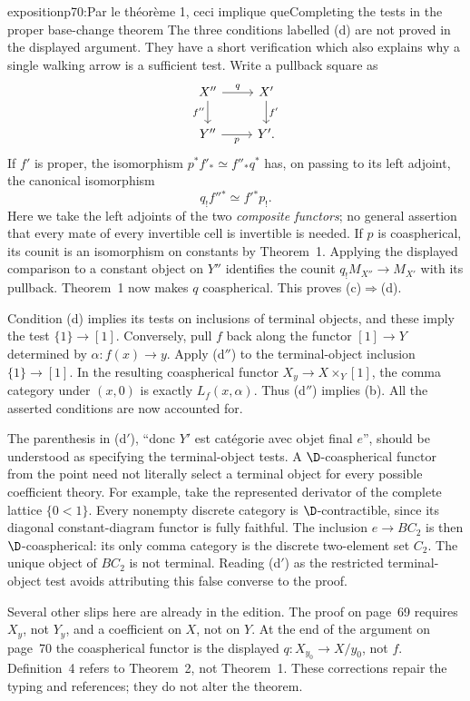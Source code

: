 \begin{dcomment}{exposition}{p70:Par le théorème 1, ceci implique que}{Completing the tests in the proper base-change theorem}
The three conditions labelled (d) are not proved in the displayed argument. They have a short verification which also explains why a single walking arrow is a sufficient test. Write a pullback square as
\[
\begin{tikzcd}
 X''\arrow[r,"q"]\arrow[d,"f''"']&X'\arrow[d,"f'"]\\
 Y''\arrow[r,"p"']&Y'.
\end{tikzcd}
\]
If $f'$ is proper, the isomorphism $p^*f'_*\simeq f''_*q^*$ has, on passing to its left adjoint, the canonical isomorphism
\[
 q_!f''{}^*\simeq f'{}^*p_!.
\]
Here we take the left adjoints of the two \emph{composite functors}; no general assertion that every mate of every invertible cell is invertible is needed. If $p$ is coaspherical, its counit is an isomorphism on constants by Theorem~1. Applying the displayed comparison to a constant object on $Y''$ identifies the counit $q_!M_{X''}\to M_{X'}$ with its pullback. Theorem~1 now makes $q$ coaspherical. This proves (c)$\Rightarrow$(d).

Condition (d) implies its tests on inclusions of terminal objects, and these imply the test $\{1\}\to[1]$. Conversely, pull $f$ back along the functor $[1]\to Y$ determined by $\alpha:f(x)\to y$. Apply (d$''$) to the terminal-object inclusion $\{1\}\to[1]$. In the resulting coaspherical functor $X_y\to X\times_Y[1]$, the comma category under $(x,0)$ is exactly $L_f(x,\alpha)$. Thus (d$''$) implies (b). All the asserted conditions are now accounted for.

The parenthesis in (d$'$), ``donc $Y'$ est catégorie avec objet final $e$'', should be understood as specifying the terminal-object tests. A $\D$-coaspherical functor from the point need not literally select a terminal object for every possible coefficient theory. For example, take the represented derivator of the complete lattice $\{0<1\}$. Every nonempty discrete category is $\D$-contractible, since its diagonal constant-diagram functor is fully faithful. The inclusion $e\to BC_2$ is then $\D$-coaspherical: its only comma category is the discrete two-element set $C_2$. The unique object of $BC_2$ is not terminal. Reading (d$\prime$) as the restricted terminal-object test avoids attributing this false converse to the proof.

Several other slips here are already in the edition. The proof on page~69 requires $X_y$, not $Y_y$, and a coefficient on $X$, not on $Y$. At the end of the argument on page~70 the coaspherical functor is the displayed $q:X_{y_0}\to X/y_0$, not $f$. Definition~4 refers to Theorem~2, not Theorem~1. These corrections repair the typing and references; they do not alter the theorem.
\end{dcomment}

